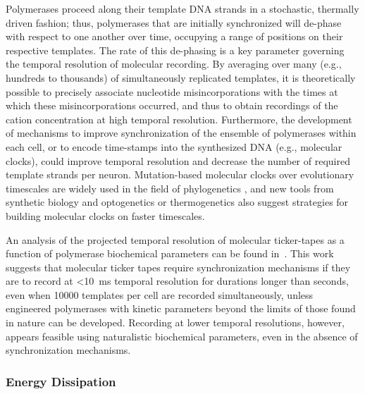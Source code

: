Polymerases proceed along their template DNA strands in a stochastic, thermally driven fashion; thus, polymerases that are initially synchronized will de-phase with respect to one another over time, occupying a range of positions on their respective templates. The rate of this de-phasing is a key parameter governing the temporal resolution of molecular recording. By averaging over many (e.g., hundreds to thousands) of simultaneously replicated templates, it is theoretically possible to precisely associate nucleotide misincorporations with the times at which these misincorporations occurred, and thus to obtain recordings of the cation concentration at high temporal resolution. Furthermore, the development of mechanisms to improve synchronization of the ensemble of polymerases within each cell, or to encode time-stamps into the synthesized DNA (e.g., molecular clocks), could improve temporal resolution and decrease the number of required template strands per neuron. Mutation-based molecular clocks over evolutionary timescales are widely used in the field of phylogenetics \cite{Ochman1987}, and new tools from synthetic biology \cite{Elowitz2000} and optogenetics or thermogenetics \cite{Bernstein2012} also suggest strategies for building molecular clocks on faster timescales.

An analysis of the projected temporal resolution of molecular ticker-tapes as a function of polymerase biochemical parameters can be found in~\cite{glaser13}.
This work suggests that molecular ticker tapes require synchronization mechanisms if they are to record at \SI{<10}{\ms} temporal resolution for durations longer than seconds, even when \num{10000} templates per cell are recorded simultaneously, unless engineered polymerases with kinetic parameters beyond the limits of those found in nature can be developed.
Recording at lower temporal resolutions, however, appears feasible using naturalistic biochemical parameters, even in the absence of synchronization mechanisms.

\subsubsection{Energy Dissipation}
